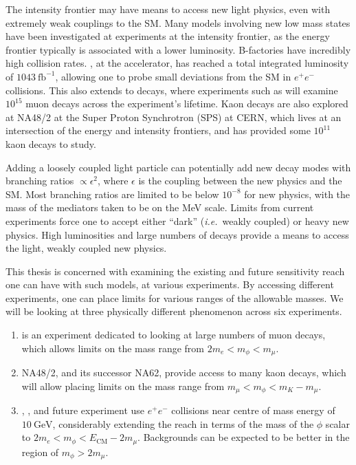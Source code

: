 \label{chapter:experiments}

The intensity frontier may have means to access new light physics, even with extremely weak couplings to the SM.
Many models involving new low mass states have been investigated at experiments at the intensity frontier, as the energy frontier typically is associated with a lower luminosity.
B-factories have incredibly high collision rates.
\belle, at the \kekb accelerator, has reached a total integrated luminosity of $1043~\textrm{fb}^{-1}$, allowing one to probe small deviations from the SM in $e^+ e^-$ collisions.
This also extends to decays, where experiments such as \mueee will examine $10^{15}$ muon decays across the experiment's lifetime.
Kaon decays are also explored at NA48/2 at the Super Proton Synchrotron (SPS) at CERN, which lives at an intersection of the energy and intensity frontiers, and has provided some $10^{11}$ kaon decays to study.

Adding a loosely coupled light particle can potentially add new decay modes with branching ratios $\propto \epsilon^2$, where $\epsilon$ is the coupling between the new physics and the SM.
Most branching ratios are limited to be below $10^{-8}$ for new physics, with the mass of the mediators taken to be on the MeV scale.
Limits from current experiments force one to accept either ``dark'' ({\em i.e.}\ weakly coupled) or heavy new physics.
High luminosities and large numbers of decays provide a means to access the light, weakly coupled new physics.

This thesis is concerned with examining the existing and future sensitivity reach one can have with such models, at various experiments.
By accessing different experiments, one can place limits for various ranges of the allowable masses.
We will be looking at three physically different phenomenon across six experiments.
\begin{enumerate}
    \item \mueee is an experiment dedicated to looking at large numbers of muon decays, which allows limits on the mass range from $2 m_e < m_\phi < m_\mu$.
    \item NA48/2, and its successor NA62, provide access to many kaon decays, which will allow placing limits on the mass range from $m_\mu < m_\phi < m_K - m_\mu$.
    \item \babar, \belle, and future experiment \belletwo use $e^+ e^-$ collisions near centre of mass energy of $10~\textrm{GeV}$, considerably extending the reach in terms of the mass of the $\phi$ scalar to $2m_e < m_\phi < E_\textrm{CM} - 2 m_\mu$. Backgrounds can be expected to be better in the region of $m_\phi > 2 m_\mu$.
\end{enumerate}

